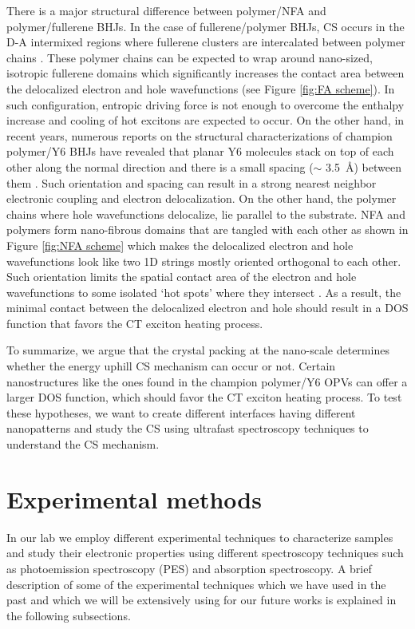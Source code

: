 \documentclass[12pt]{article}
\begin{document}
There is a major structural difference between polymer/NFA and polymer/fullerene BHJs. In the case of fullerene/polymer BHJs, CS occurs in the D-A intermixed regions where fullerene clusters are intercalated between polymer chains \cite{causa2016fate}. These polymer chains can be expected to wrap around nano-sized, isotropic fullerene domains which significantly increases the contact area between the delocalized electron and hole wavefunctions (see Figure \ref{fig:FA scheme}). In such configuration, entropic driving force is not enough to overcome the enthalpy increase and cooling of hot excitons are expected to occur. On the other hand, in recent years, numerous reports on the structural characterizations of champion polymer/Y6 BHJs have revealed that planar Y6 molecules stack on top of each other along the normal direction and there is a small spacing ($\sim$ \SI{3.5}{\angstrom}) between them \cite{liu202018,zhang2020delocalization,zhu2020crystallography}. Such orientation and spacing can result in a strong nearest neighbor electronic coupling and electron delocalization. On the other hand, the polymer chains where hole wavefunctions delocalize, lie parallel to the substrate. NFA and polymers form nano-fibrous domains that are tangled with each other as shown in Figure \ref{fig:NFA scheme} which makes the delocalized electron and hole wavefunctions look like two 1D strings mostly oriented orthogonal to each other. Such orientation limits the spatial contact area of the electron and hole wavefunctions to some isolated \lq{hot spots}' where they intersect \cite{zhang2020delocalization}. As a result, the minimal contact between the delocalized electron and hole should result in a DOS function that favors the CT exciton heating process.
\vspace{7pt}

To summarize, we argue that the crystal packing at the nano-scale determines whether the energy uphill CS mechanism can occur or not. Certain nanostructures like the ones found in the champion polymer/Y6 OPVs can offer a larger DOS function, which should favor the CT exciton heating process. To test these hypotheses, we want to create different interfaces having different nanopatterns and study the CS using ultrafast spectroscopy techniques to understand the CS mechanism.

\section{Experimental methods}
In our lab we employ different experimental techniques to characterize samples and study their electronic properties using different spectroscopy techniques such as photoemission spectroscopy (PES) and absorption spectroscopy. A brief description of some of the experimental techniques which we have used in the past and which we will be extensively using for our future works is explained in the following subsections. 
\end{document}
